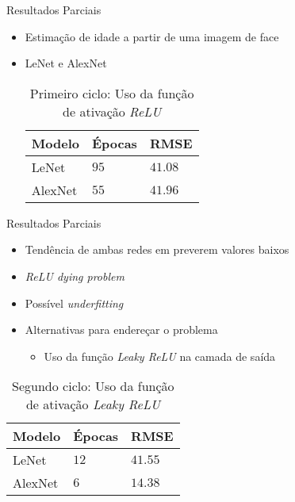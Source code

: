 \begin{frame}{Resultados Parciais}
 \begin{itemize}
   \item Estimação de idade a partir de uma imagem de face
   \item LeNet e AlexNet
   \begin{table}[h!]
        \caption{Primeiro ciclo: Uso da função de ativação \emph{ReLU}}
        \label{tab:results_relu}
        \centering
        \begin{tabular}{l l l}
             \toprule
             Modelo & Épocas &RMSE \\
             \midrule
             LeNet & $95$ & $41.08$ \\
             AlexNet & $55$ & $41.96$\\
             \bottomrule
        \end{tabular}
   \end{table}
   \end{itemize}
\end{frame}

\begin{frame}{Resultados Parciais}
 \begin{itemize}
   \item Tendência de ambas redes em preverem valores baixos
   \item \emph{ReLU dying problem}
   \item Possível \emph{underfitting}
   \item Alternativas para endereçar o problema
   \begin{itemize}
        \item Uso da função \emph{Leaky ReLU} na camada de saída
   \end{itemize}
   \end{itemize}
   \pause
   \begin{table}[h!]
        \caption{Segundo ciclo: Uso da função de ativação \emph{Leaky ReLU}}
        \label{tab:results_leaky}
        \centering
        \begin{tabular}{l l l}
             \toprule
             Modelo & Épocas & RMSE \\
             \midrule
             LeNet & $12$ & $41.55$ \\
             AlexNet & $6$ & $14.38$\\
             \bottomrule
        \end{tabular}
   \end{table}
\end{frame}
